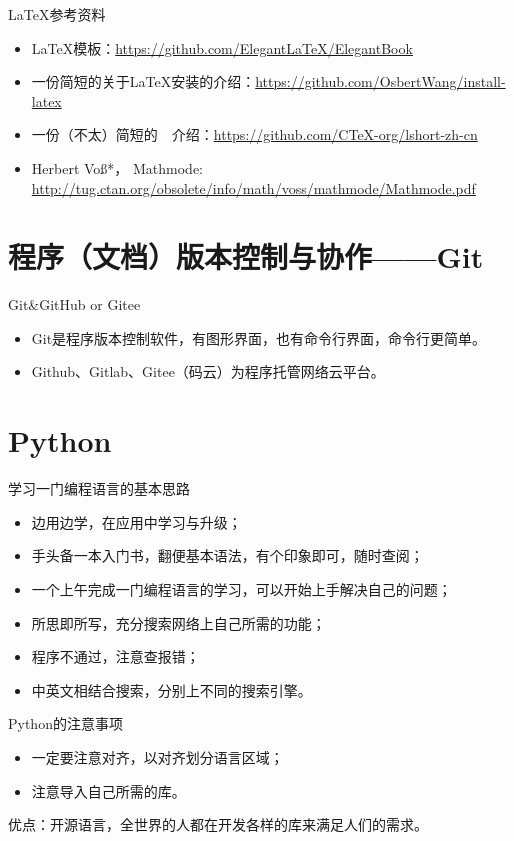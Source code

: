 \documentclass[xcolor=x11names,compress,10pt]{ctexbeamer}
\begin{document}
\begin{frame}{\LaTeX 参考资料}
\begin{itemize}
\item \LaTeX{}模板：\url{https://github.com/ElegantLaTeX/ElegantBook}
\item 一份简短的关于\LaTeX{}安装的介绍：\url{https://github.com/OsbertWang/install-latex}
\item 一份（不太）简短的~\LaTeXe{}~介绍：\url{https://github.com/CTeX-org/lshort-zh-cn}
\item Herbert Voß*，  Mathmode: \url{http://tug.ctan.org/obsolete/info/math/voss/mathmode/Mathmode.pdf}
\end{itemize}
\end{frame}



\section[Git]{程序（文档）版本控制与协作——Git}
\begin{frame}{Git\&GitHub or Gitee}
\begin{itemize}
\item Git是程序版本控制软件，有图形界面，也有命令行界面，命令行更简单。
\item Github、Gitlab、Gitee（码云）为程序托管网络云平台。
\end{itemize}
\end{frame}



\section[Python]{Python}
\begin{frame}{学习一门编程语言的基本思路}
\begin{itemize}
\item 边用边学，在应用中学习与升级；
\item 手头备一本入门书，翻便基本语法，有个印象即可，随时查阅；
\item 一个上午完成一门编程语言的学习，可以开始上手解决自己的问题；
\item 所思即所写，充分搜索网络上自己所需的功能；
\item 程序不通过，注意查报错；
\item 中英文相结合搜索，分别上不同的搜索引擎。
\end{itemize}
\end{frame}


\begin{frame}{Python的注意事项}
\begin{itemize}
\item 一定要注意对齐，以对齐划分语言区域；
\item 注意导入自己所需的库。
\end{itemize}

优点：开源语言，全世界的人都在开发各样的库来满足人们的需求。
\end{frame}
\end{document}
